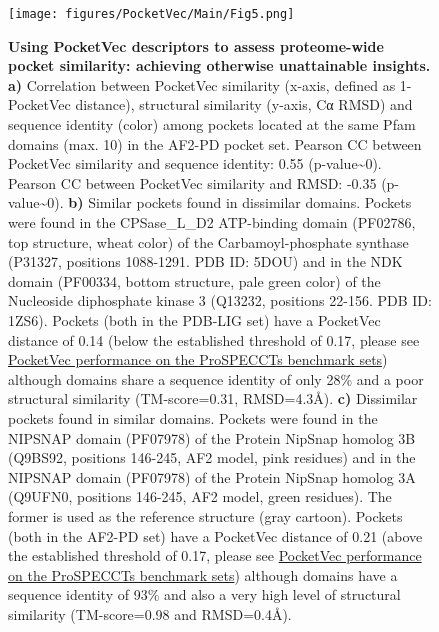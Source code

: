 
\begin{figure}[htbp]
  \centering
  \texttt{[image: figures/PocketVec/Main/Fig5.png]} 
  \caption{
    \textbf{Using PocketVec descriptors to assess proteome-wide pocket similarity: achieving otherwise unattainable insights.} 
    \textbf{a)} Correlation between PocketVec similarity (x-axis, defined as 1-PocketVec distance), structural similarity (y-axis, Cα RMSD) and sequence identity (color) among pockets located at the same Pfam domains (max. 10) in the AF2-PD pocket set. Pearson CC between PocketVec similarity and sequence identity: 0.55 (p-value\textasciitilde0). Pearson CC between PocketVec similarity and RMSD: -0.35 (p-value\textasciitilde0).
    \textbf{b)} Similar pockets found in dissimilar domains. Pockets were found in the CPSase\_L\_D2 ATP-binding domain (PF02786, top structure, wheat color) of the Carbamoyl-phosphate synthase (P31327, positions 1088-1291. PDB ID: 5DOU) and in the NDK domain (PF00334, bottom structure, pale green color) of the Nucleoside diphosphate kinase 3 (Q13232, positions 22-156. PDB ID: 1ZS6). Pockets (both in the PDB-LIG set) have a PocketVec distance of 0.14 (below the established threshold of 0.17, please see \hyperref[PocketVec_ResultsAndDiscussion_PocketVec_performance_on_the_ProSPECCTs_benchmark]{PocketVec performance on the ProSPECCTs benchmark sets}) although domains share a sequence identity of only 28\% and a poor structural similarity (TM-score=0.31, RMSD=4.3Å).
    \textbf{c)} Dissimilar pockets found in similar domains. Pockets were found in the NIPSNAP domain (PF07978) of the Protein NipSnap homolog 3B (Q9BS92, positions 146-245, AF2 model, pink residues) and in the NIPSNAP domain (PF07978) of the Protein NipSnap homolog 3A (Q9UFN0, positions 146-245, AF2 model, green residues). The former is used as the reference structure (gray cartoon). Pockets (both in the AF2-PD set) have a PocketVec distance of 0.21 (above the established threshold of 0.17, please see \hyperref[PocketVec_ResultsAndDiscussion_PocketVec_performance_on_the_ProSPECCTs_benchmark]{PocketVec performance on the ProSPECCTs benchmark sets}) although domains have a sequence identity of 93\% and also a very high level of structural similarity (TM-score=0.98 and RMSD=0.4Å).
  }
  \label{PocketVec_Fig5}
\end{figure}





